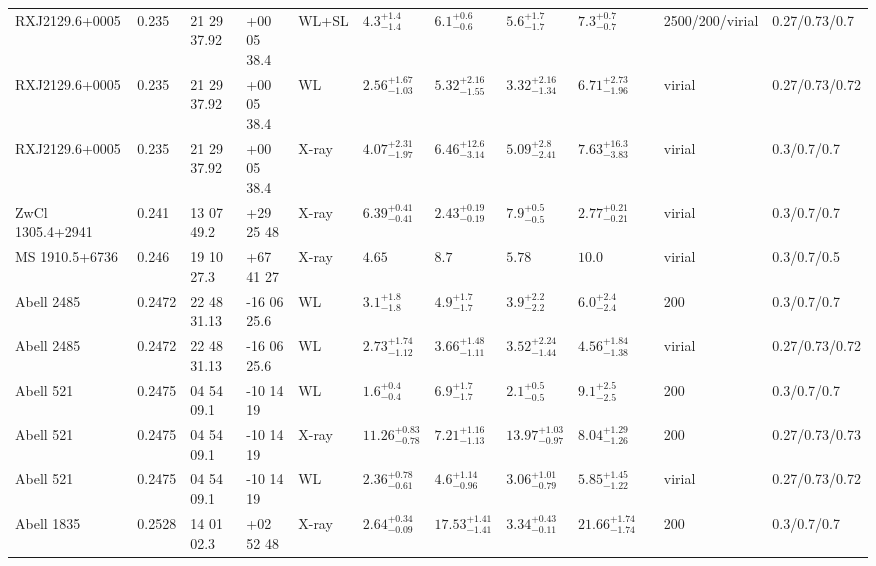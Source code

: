 \begin{landscape}
\begin{center}
{\begin{longtable}{llllllllllll}
RXJ2129.6+0005 & 0.235 & 21 29 37.92 & +00 05 38.4 & WL+SL & ${4.3}^{+1.4}_{-1.4}$ & ${6.1}^{+0.6}_{-0.6}$ & ${5.6}^{+1.7}_{-1.7}$ & ${7.3}^{+0.7}_{-0.7}$ & \citet{ME14.1} & 2500/200/virial & 0.27/0.73/0.7 \\
RXJ2129.6+0005 & 0.235 & 21 29 37.92 & +00 05 38.4 & WL & ${2.56}^{+1.67}_{-1.03}$ & ${5.32}^{+2.16}_{-1.55}$ & ${3.32}^{+2.16}_{-1.34}$ & ${6.71}^{+2.73}_{-1.96}$ & \citet{OK10.1} & virial & 0.27/0.73/0.72 \\
RXJ2129.6+0005 & 0.235 & 21 29 37.92 & +00 05 38.4 & X-ray & ${4.07}^{+2.31}_{-1.97}$ & ${6.46}^{+12.6}_{-3.14}$ & ${5.09}^{+2.8}_{-2.41}$ & ${7.63}^{+16.3}_{-3.83}$ & \citet{SC07.1} & virial & 0.3/0.7/0.7 \\
ZwCl 1305.4+2941 & 0.241 & 13 07 49.2 & +29 25 48 & X-ray & ${6.39}^{+0.41}_{-0.41}$ & ${2.43}^{+0.19}_{-0.19}$ & ${7.9}^{+0.5}_{-0.5}$ & ${2.77}^{+0.21}_{-0.21}$ & \citet{GA08.1} & virial & 0.3/0.7/0.7 \\
MS 1910.5+6736 & 0.246 & 19 10 27.3 & +67 41 27 & X-ray & ${4.65}^{}_{}$ & ${8.7}^{}_{}$ & ${5.78}^{}_{}$ & ${10.0}^{}_{}$ & \citet{MO99.1} & virial & 0.3/0.7/0.5 \\
Abell 2485 & 0.2472 & 22 48 31.13 & -16 06 25.6 & WL & ${3.1}^{+1.8}_{-1.8}$ & ${4.9}^{+1.7}_{-1.7}$ & ${3.9}^{+2.2}_{-2.2}$ & ${6.0}^{+2.4}_{-2.4}$ & \citet{SE14.1} & 200 & 0.3/0.7/0.7 \\
Abell 2485 & 0.2472 & 22 48 31.13 & -16 06 25.6 & WL & ${2.73}^{+1.74}_{-1.12}$ & ${3.66}^{+1.48}_{-1.11}$ & ${3.52}^{+2.24}_{-1.44}$ & ${4.56}^{+1.84}_{-1.38}$ & \citet{OK10.1} & virial & 0.27/0.73/0.72 \\
Abell 521 & 0.2475 & 04 54 09.1 & -10 14 19 & WL & ${1.6}^{+0.4}_{-0.4}$ & ${6.9}^{+1.7}_{-1.7}$ & ${2.1}^{+0.5}_{-0.5}$ & ${9.1}^{+2.5}_{-2.5}$ & \citet{SE14.1} & 200 & 0.3/0.7/0.7 \\
Abell 521 & 0.2475 & 04 54 09.1 & -10 14 19 & X-ray & ${11.26}^{+0.83}_{-0.78}$ & ${7.21}^{+1.16}_{-1.13}$ & ${13.97}^{+1.03}_{-0.97}$ & ${8.04}^{+1.29}_{-1.26}$ & \citet{BA14.1} & 200 & 0.27/0.73/0.73 \\
Abell 521 & 0.2475 & 04 54 09.1 & -10 14 19 & WL & ${2.36}^{+0.78}_{-0.61}$ & ${4.6}^{+1.14}_{-0.96}$ & ${3.06}^{+1.01}_{-0.79}$ & ${5.85}^{+1.45}_{-1.22}$ & \citet{OK10.1} & virial & 0.27/0.73/0.72 \\
Abell 1835 & 0.2528 & 14 01 02.3 & +02 52 48 & X-ray & ${2.64}^{+0.34}_{-0.09}$ & ${17.53}^{+1.41}_{-1.41}$ & ${3.34}^{+0.43}_{-0.11}$ & ${21.66}^{+1.74}_{-1.74}$ & \citet{ET11.1} & 200 & 0.3/0.7/0.7 \\

\end{longtable}}
\end{center}
\end{landscape}
